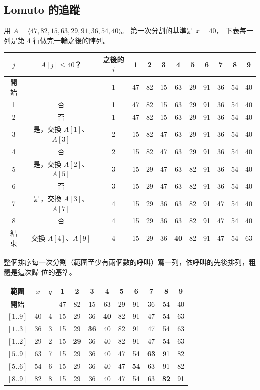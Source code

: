 \subsection{Lomuto 的追蹤}

用 $A = \langle 47, 82, 15, 63, 29, 91, 36, 54, 40 \rangle$。 第一次分割的基準是 $x = 40$，
下表每一列是第 4 行做完一輪之後的陣列。

\begin{center}
\small
\begin{tabular}{ccc*{9}{c}}
\toprule
$j$ & $A[j] \le 40$？ & 之後的 $i$ & 1 & 2 & 3 & 4 & 5 & 6 & 7 & 8 & 9 \\
\midrule
開始 & & 1 & 47 & 82 & 15 & 63 & 29 & 91 & 36 & 54 & 40 \\
1 & 否 & 1 & 47 & 82 & 15 & 63 & 29 & 91 & 36 & 54 & 40 \\
2 & 否 & 1 & 47 & 82 & 15 & 63 & 29 & 91 & 36 & 54 & 40 \\
3 & 是，交換 $A[1]$、$A[3]$ & 2 & 15 & 82 & 47 & 63 & 29 & 91 & 36 & 54 & 40 \\
4 & 否 & 2 & 15 & 82 & 47 & 63 & 29 & 91 & 36 & 54 & 40 \\
5 & 是，交換 $A[2]$、$A[5]$ & 3 & 15 & 29 & 47 & 63 & 82 & 91 & 36 & 54 & 40 \\
6 & 否 & 3 & 15 & 29 & 47 & 63 & 82 & 91 & 36 & 54 & 40 \\
7 & 是，交換 $A[3]$、$A[7]$ & 4 & 15 & 29 & 36 & 63 & 82 & 91 & 47 & 54 & 40 \\
8 & 否 & 4 & 15 & 29 & 36 & 63 & 82 & 91 & 47 & 54 & 40 \\
結束 & 交換 $A[4]$、$A[9]$ & 4 & 15 & 29 & 36 & \textbf{40} & 82 & 91 & 47 & 54 & 63 \\
\bottomrule
\end{tabular}
\end{center}

整個排序每一次分割（範圍至少有兩個數的呼叫）寫一列，依呼叫的先後排列，粗體是這次歸
位的基準。

\begin{center}
\begin{tabular}{ccc*{9}{c}}
\toprule
範圍 & $x$ & $q$ & 1 & 2 & 3 & 4 & 5 & 6 & 7 & 8 & 9 \\
\midrule
開始 & & & 47 & 82 & 15 & 63 & 29 & 91 & 36 & 54 & 40 \\
$[1..9]$ & 40 & 4 & 15 & 29 & 36 & \textbf{40} & 82 & 91 & 47 & 54 & 63 \\
$[1..3]$ & 36 & 3 & 15 & 29 & \textbf{36} & 40 & 82 & 91 & 47 & 54 & 63 \\
$[1..2]$ & 29 & 2 & 15 & \textbf{29} & 36 & 40 & 82 & 91 & 47 & 54 & 63 \\
$[5..9]$ & 63 & 7 & 15 & 29 & 36 & 40 & 47 & 54 & \textbf{63} & 91 & 82 \\
$[5..6]$ & 54 & 6 & 15 & 29 & 36 & 40 & 47 & \textbf{54} & 63 & 91 & 82 \\
$[8..9]$ & 82 & 8 & 15 & 29 & 36 & 40 & 47 & 54 & 63 & \textbf{82} & 91 \\
\bottomrule
\end{tabular}
\end{center}

